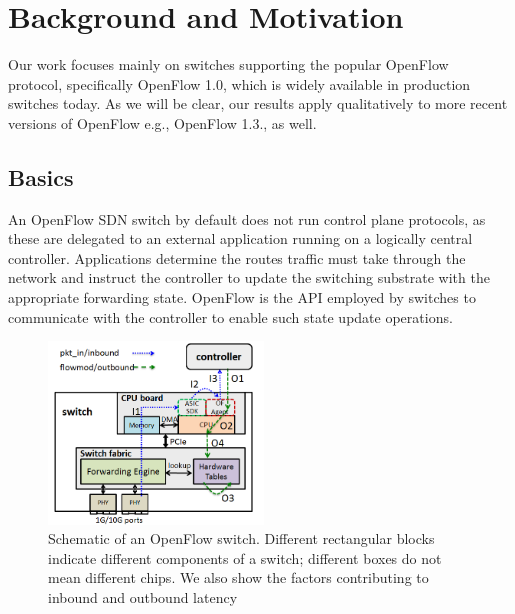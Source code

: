 \section{Background and Motivation}
\label{sec-motivation}


Our work focuses mainly on switches supporting the popular
OpenFlow~\cite{openflow} protocol, specifically OpenFlow 1.0, which is
widely available in production switches today. As we will be clear,
our results apply qualitatively to more recent versions of OpenFlow
e.g., OpenFlow 1.3., as well.


\subsection{Basics}

An OpenFlow SDN switch by default does not run control plane protocols, as these
are delegated to an external application running on a logically
central controller. Applications determine the routes traffic must
take through the network and instruct the controller to update the
switching substrate with the appropriate forwarding state. OpenFlow is
the API employed by switches to communicate with the controller to
enable such state update operations. %


\begin{figure}[!thb]
\centering
\includegraphics[width=2.25in]{figs/openflow_switch.PNG}
\caption{Schematic of an OpenFlow switch. Different rectangular blocks indicate different components of a switch; 
different boxes do not mean different chips. We also show the factors contributing to inbound and outbound latency}\label{openflow_switch_delay}
\end{figure}

